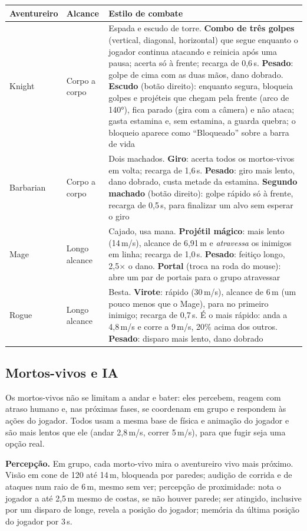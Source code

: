\documentclass[11pt,a4paper]{article}
\begin{document}
\begin{tabularx}{\textwidth}{@{}llX@{}}
\toprule
\textbf{Aventureiro} & \textbf{Alcance} & \textbf{Estilo de combate} \\
\midrule
Knight & Corpo a corpo & Espada e escudo de torre. \textbf{Combo de três golpes} (vertical, diagonal, horizontal) que segue enquanto o jogador continua atacando e reinicia após uma pausa; acerta só à frente; recarga de 0,6\,s. \textbf{Pesado}: golpe de cima com as duas mãos, dano dobrado. \textbf{Escudo} (botão direito): enquanto segura, bloqueia golpes e projéteis que chegam pela frente (arco de 140°), fica parado (gira com a câmera) e não ataca; gasta estamina e, sem estamina, a guarda quebra; o bloqueio aparece como ``Bloqueado'' sobre a barra de vida \\
Barbarian & Corpo a corpo & Dois machados. \textbf{Giro}: acerta todos os mortos-vivos em volta; recarga de 1,6\,s. \textbf{Pesado}: giro mais lento, dano dobrado, custa metade da estamina. \textbf{Segundo machado} (botão direito): golpe rápido só à frente, recarga de 0,5\,s, para finalizar um alvo sem esperar o giro \\
Mage & Longo alcance & Cajado, usa mana. \textbf{Projétil mágico}: mais lento (14\,m/s), alcance de 6,91\,m e \emph{atravessa} os inimigos em linha; recarga de 1,0\,s. \textbf{Pesado}: feitiço longo, 2,5$\times$ o dano. \textbf{Portal} (troca na roda do mouse): abre um par de portais para o grupo atravessar \\
Rogue & Longo alcance & Besta. \textbf{Virote}: rápido (30\,m/s), alcance de 6\,m (um pouco menos que o Mage), para no primeiro inimigo; recarga de 0,7\,s. É o mais rápido: anda a 4,8\,m/s e corre a 9\,m/s, 20\% acima dos outros. \textbf{Pesado}: disparo mais lento, dano dobrado \\
\bottomrule
\end{tabularx}

\subsection{Mortos-vivos e IA}

Os mortos-vivos não se limitam a andar e bater: eles percebem, reagem com atraso humano e, nas próximas fases, se coordenam em grupo e respondem às ações do jogador. Todos usam a mesma base de física e animação do jogador e são mais lentos que ele (andar 2,8\,m/s, correr 5\,m/s), para que fugir seja uma opção real.

\textbf{Percepção.} Em grupo, cada morto-vivo mira o aventureiro vivo mais próximo. Visão em cone de 120\textdegree{} até 14\,m, bloqueada por paredes; audição de corrida e de ataques num raio de 6\,m, mesmo sem ver; percepção de proximidade: nota o jogador a até 2,5\,m mesmo de costas, se não houver parede; ser atingido, inclusive por um disparo de longe, revela a posição do jogador; memória da última posição do jogador por 3\,s.
\end{document}
